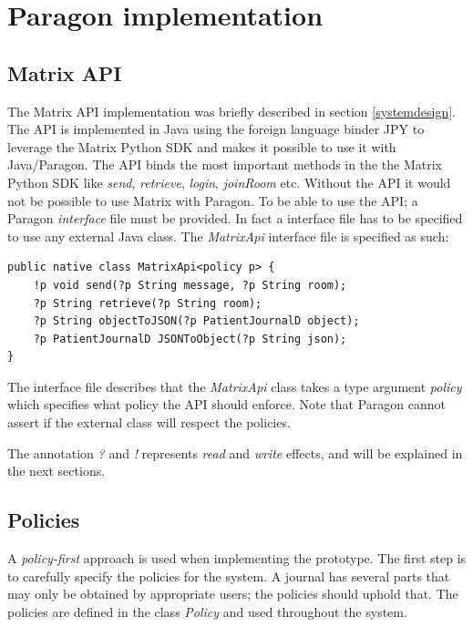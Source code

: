 
\section{Paragon implementation}

\subsection{Matrix API}

The Matrix API implementation was briefly described in section \ref{systemdesign}. The API is implemented in Java using the foreign language binder JPY to leverage the Matrix Python SDK and makes it possible to use it with Java/Paragon. The API binds the most important methods in the the Matrix Python SDK like \emph{send}, \emph{retrieve}, \emph{login}, \emph{joinRoom} etc. Without the API it would not be possible to use Matrix with Paragon. To be able to use the API; a Paragon \emph{interface} file must be provided. In fact a interface file has to be specified to use any external Java class. The \emph{MatrixApi} interface file is specified as such:

\begin{lstlisting}
public native class MatrixApi<policy p> {
	!p void send(?p String message, ?p String room);
	?p String retrieve(?p String room);
	?p String objectToJSON(?p PatientJournalD object);
	?p PatientJournalD JSONToObject(?p String json);
}
\end{lstlisting}

The interface file describes that the \emph{MatrixApi} class takes a type argument \emph{policy} which specifies what policy the API should enforce. Note that Paragon cannot assert if the external class will respect the policies.

The annotation \emph{?} and \emph{!} represents \emph{read} and \emph{write} effects, and will be explained in the next sections.
 
\subsection{Policies}\label{policies} 

A \emph{policy-first} approach is used when implementing the prototype. The first step is to carefully specify the policies for the system. A journal has several parts that may only be obtained by appropriate users; the policies should uphold that. The policies are defined in the class \emph{Policy} and used throughout the system.

